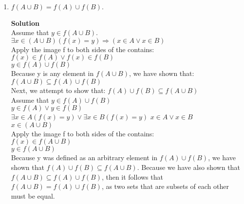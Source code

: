 \documentclass[11pt]{article}
\begin{document}
\begin{enumerate}
\pagebreak
\item $f(A \cup B) = f(A) \cup f(B)$.
\begin{mdframed} \textbf{Solution} \\
Assume that $y \in f(A \cup B)$. \\
$\exists x \in (A \cup B)(f(x)=y) \Rightarrow (x \in A \lor x \in B)$ \\
Apply the image f to both sides of the contains: \\
$f(x) \in f(A) \lor f(x) \in f(B)$ \\
$y \in f(A) \cup f(B)$ \\
Because y is any element in $f(A \cup B)$, we have shown that: \\
$f(A \cup B) \subseteq f(A) \cup f(B)$ \\
Next, we attempt to show that:
$f(A) \cup f(B) \subseteq f(A \cup B)$ \\
Assume that $y \in f(A) \cup f(B)$ \\
$y \in f(A) \lor y \in f(B)$ \\
$\exists x \in A(f(x)=y) \lor \exists x \in B(f(x)=y)$
$x \in A \lor x \in B$ \\
$x \in (A \cup B)$ \\
Apply the image f to both sides of the contains: \\
$f(x) \in f(A \cup B)$ \\
$y \in f(A \cup B)$ \\
Because y was defined as an arbitrary element in $f(A) \cup f(B)$, we have shown that $f(A) \cup f(B) \subseteq f(A \cup B)$. Because we have also shown that $f(A \cup B) \subseteq f(A) \cup f(B)$, then it follows that $f(A \cup B) = f(A) \cup f(B)$, as two sets that are subsets of each other must be equal.
\end{mdframed}


\end{enumerate}
\end{document}
